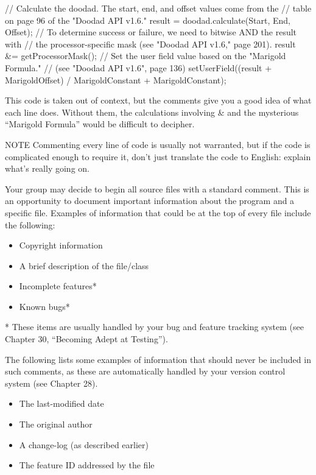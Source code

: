 \begin{cpp}
// Calculate the doodad. The start, end, and offset values come from the
// table on page 96 of the "Doodad API v1.6."
result = doodad.calculate(Start, End, Offset);
// To determine success or failure, we need to bitwise AND the result with
// the processor-specific mask (see "Doodad API v1.6," page 201).
result &= getProcessorMask();
// Set the user field value based on the "Marigold Formula."
// (see "Doodad API v1.6", page 136)
setUserField((result + MarigoldOffset) / MarigoldConstant + MarigoldConstant);
\end{cpp}

This code is taken out of context, but the comments give you a good idea of what each line does. Without them, the calculations involving \& and the mysterious “Marigold Formula” would be difficult to decipher.

\begin{myNotic}{NOTE}
Commenting every line of code is usually not warranted, but if the code is complicated enough to require it, don’t just translate the code to English: explain what’s really going on.
\end{myNotic}


Your group may decide to begin all source files with a standard comment. This is an opportunity to document important information about the program and a specific file. Examples of information that could be at the top of every file include the following:

\begin{itemize}
\item
Copyright information

\item
A brief description of the file/class

\item
Incomplete features*

\item
Known bugs*
\end{itemize}

* These items are usually handled by your bug and feature tracking system (see Chapter 30, “Becoming Adept at Testing”).

The following lists some examples of information that should never be included in such comments, as these are automatically handled by your version control system (see Chapter 28).

\begin{itemize}
\item
The last-modified date

\item
The original author

\item
 A change-log (as described earlier)

\item
The feature ID addressed by the file
\end{itemize}

